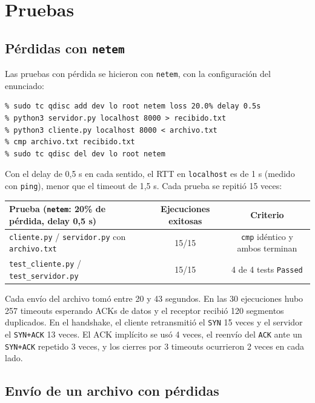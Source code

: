 \documentclass[11pt,letterpaper]{article}
\begin{document}
\section{Pruebas}

\subsection{Pérdidas con \texttt{netem}}
\label{sec:netem}

Las pruebas con pérdida se hicieron con \texttt{netem}, con la configuración del
enunciado:

\begin{lstlisting}
% sudo tc qdisc add dev lo root netem loss 20.0% delay 0.5s
% python3 servidor.py localhost 8000 > recibido.txt
% python3 cliente.py localhost 8000 < archivo.txt
% cmp archivo.txt recibido.txt
% sudo tc qdisc del dev lo root netem
\end{lstlisting}

Con el delay de 0,5 s en cada sentido, el RTT en \texttt{localhost} es de 1 s (medido con
\texttt{ping}), menor que el timeout de 1,5 s. Cada prueba se repitió 15 veces:

\begin{center}
\begin{tabular}{@{}lcc@{}}
  \toprule
  Prueba (\texttt{netem}: 20\% de pérdida, delay 0,5 s) & Ejecuciones exitosas & Criterio \\
  \midrule
  \texttt{cliente.py} / \texttt{servidor.py} con \texttt{archivo.txt} & 15/15 & \texttt{cmp} idéntico y ambos terminan \\
  \texttt{test\_cliente.py} / \texttt{test\_servidor.py} & 15/15 & 4 de 4 tests \texttt{Passed} \\
  \bottomrule
\end{tabular}
\end{center}

Cada envío del archivo tomó entre 20 y 43 segundos. En las 30 ejecuciones hubo 257
timeouts esperando ACKs de datos y el receptor recibió 120 segmentos duplicados. En el
handshake, el cliente retransmitió el \texttt{SYN} 15 veces y el servidor el
\texttt{SYN+ACK} 13 veces. El ACK implícito se usó 4 veces, el reenvío del \texttt{ACK}
ante un \texttt{SYN+ACK} repetido 3 veces, y los cierres por 3 timeouts ocurrieron 2
veces en cada lado.

\subsection{Envío de un archivo con pérdidas}
\end{document}
